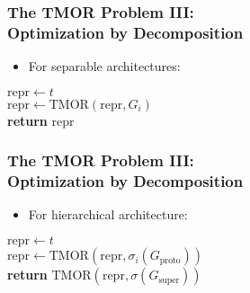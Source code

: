 \documentclass{beamer}
\begin{document}
\begin{frame}
  \frametitle{The TMOR Problem III:\\Optimization by Decomposition}

  \begin{itemize}
    \item For separable architectures:
  \end{itemize}

  \vspace{.25cm}

  \begin{algorithmic}[1]
      \State $\mathrm{repr} \gets t$
      \\
        \State $\mathrm{repr} \gets \mathrm{TMOR}(\mathrm{repr}, G_i)$
      \EndFor
      \\
      \State \textbf{return} $\mathrm{repr}$
    \EndProcedure
  \end{algorithmic}
\end{frame}

\begin{frame}
  \frametitle{The TMOR Problem III:\\Optimization by Decomposition}

  \begin{itemize}
    \item For hierarchical architecture:
  \end{itemize}

  \vspace{.25cm}

  \begin{algorithmic}[1]
    \State $\mathrm{repr} \gets t$
    \\
      \State $\mathrm{repr} \gets \mathrm{TMOR}(\mathrm{repr},
                                                \sigma_i(G_{\mathrm{proto}}))$
    \EndFor
    \\
    \State \textbf{return} $\mathrm{TMOR}(\mathrm{repr}, \sigma(G_{\mathrm{super}}))$
  \EndProcedure
  \end{algorithmic}
\end{frame}
\end{document}
